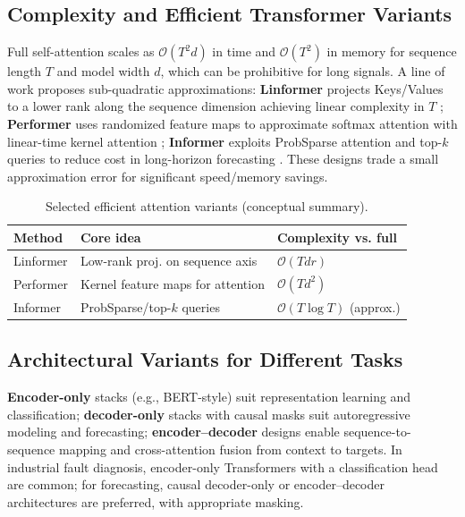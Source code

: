 \subsection{Complexity and Efficient Transformer Variants}
Full self-attention scales as \(\mathcal{O}(T^2 d)\) in time and \(\mathcal{O}(T^2)\) in memory for sequence length \(T\) and model width \(d\), which can be prohibitive for long signals. A line of work proposes sub-quadratic approximations: \textbf{Linformer} projects Keys/Values to a lower rank along the sequence dimension achieving linear complexity in \(T\) \citep{wang2020linformer}; \textbf{Performer} uses randomized feature maps to approximate softmax attention with linear-time kernel attention \citep{choromanski2021rethinking}; \textbf{Informer} exploits ProbSparse attention and top-$k$ queries to reduce cost in long-horizon forecasting \citep{zhou2021informer}. These designs trade a small approximation error for significant speed/memory savings.

\begin{table}[h]
\centering
\caption{Selected efficient attention variants (conceptual summary).}
\label{tab:efficient_attention}
\begin{tabular}{l l l}
\hline
Method & Core idea & Complexity vs. full \\ \hline
Linformer & Low-rank proj. on sequence axis & \(\mathcal{O}(T d r)\) \\
Performer & Kernel feature maps for attention & \(\mathcal{O}(T d^2)\) \\
Informer & ProbSparse/top-$k$ queries & \(\mathcal{O}(T \log T)\) (approx.) \\ \hline
\end{tabular}
\end{table}

\subsection{Architectural Variants for Different Tasks}
\textbf{Encoder-only} stacks (e.g., BERT-style) suit representation learning and classification; \textbf{decoder-only} stacks with causal masks suit autoregressive modeling and forecasting; \textbf{encoder--decoder} designs enable sequence-to-sequence mapping and cross-attention fusion from context to targets. In industrial fault diagnosis, encoder-only Transformers with a classification head are common; for forecasting, causal decoder-only or encoder--decoder architectures are preferred, with appropriate masking.


